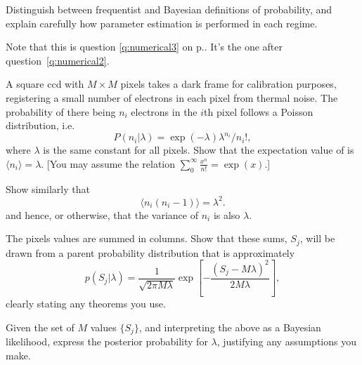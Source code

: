 \documentclass[compose]{exam-n}
\begin{document}
\begin{question}{30} 
Distinguish between frequentist and Bayesian definitions of
probability, and explain carefully how parameter estimation is
performed in each regime.

\label{q:numerical3}
Note that this is question \ref{q:numerical3} on
p.\pageref{q:numerical3}.  It's the one after question~\ref{q:numerical2}.

A square ccd with $M\times M$ pixels takes a dark frame for
calibration purposes, registering a small number of electrons in
each pixel from thermal noise. The probability of there being $n_i$
electrons in the $i$th pixel follows a Poisson distribution, i.e.
\begin{equation*}
 P(n_i|\lambda) = \exp(-\lambda)\lambda^{n_i}/n_i!,
\end{equation*}
where $\lambda$ is the same constant for all pixels. Show that the
expectation value of  is $\langle n_i \rangle = \lambda$.
 [You may assume the relation $\sum_0^\infty \frac{x^n}{n!}=\exp(x)$.]

Show similarly that
\begin{equation*}
 \langle n_i(n_i-1) \rangle = \lambda^2.
\end{equation*}
and hence, or otherwise, that the variance of $n_i$ is also
$\lambda$.

The pixels values are summed in columns.  Show that these sums,
$S_j$, will be drawn from a parent probability distribution that is
approximately
\begin{equation*} p(S_j|\lambda)=\frac{1}{\sqrt{2\pi
M\lambda}}\exp\left[-\frac{(S_j-M\lambda)^2}{2M\lambda}\right],
\end{equation*}
clearly stating any theorems you use.

Given the set of $M$ values $\{S_j\}$, and interpreting the above
as a Bayesian likelihood, express the posterior probability for
$\lambda$, justifying any assumptions you make.
\end{question}
\end{document}
